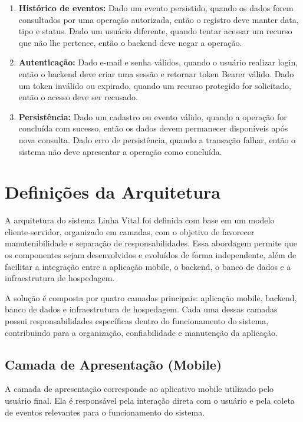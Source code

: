 \begin{enumerate}
\item \textbf{Histórico de eventos:} Dado um evento persistido, quando os dados forem consultados por uma operação autorizada, então o registro deve manter data, tipo e status. Dado um usuário diferente, quando tentar acessar um recurso que não lhe pertence, então o backend deve negar a operação.
\item \textbf{Autenticação:} Dado e-mail e senha válidos, quando o usuário realizar login, então o backend deve criar uma sessão e retornar token Bearer válido. Dado um token inválido ou expirado, quando um recurso protegido for solicitado, então o acesso deve ser recusado.
\item \textbf{Persistência:} Dado um cadastro ou evento válido, quando a operação for concluída com sucesso, então os dados devem permanecer disponíveis após nova consulta. Dado erro de persistência, quando a transação falhar, então o sistema não deve apresentar a operação como concluída.
\end{enumerate}

\section{Definições da Arquitetura}

A arquitetura do sistema Linha Vital foi definida com base em um modelo cliente-servidor, organizado em camadas, com o objetivo de favorecer manutenibilidade e separação de responsabilidades. Essa abordagem permite que os componentes sejam desenvolvidos e evoluídos de forma independente, além de facilitar a integração entre a aplicação mobile, o backend, o banco de dados e a infraestrutura de hospedagem.

A solução é composta por quatro camadas principais: aplicação mobile, backend, banco de dados e infraestrutura de hospedagem. Cada uma dessas camadas possui responsabilidades específicas dentro do funcionamento do sistema, contribuindo para a organização, confiabilidade e manutenção da aplicação.

\subsection{Camada de Apresentação (Mobile)}

A camada de apresentação corresponde ao aplicativo mobile utilizado pelo usuário final. Ela é responsável pela interação direta com o usuário e pela coleta de eventos relevantes para o funcionamento do sistema.

